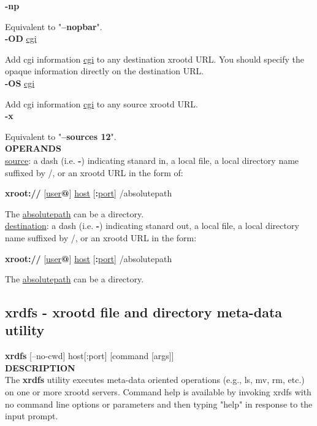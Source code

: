 \documentclass{article}
\begin{document}
		\noindent \textbf{-np}

		\noindent Equivalent to "\textbf{--nopbar}". \\
		
		\noindent \textbf{-OD} \underline{cgi}

		\noindent Add cgi information \underline{cgi} to any destination xrootd URL.
		You should specify the opaque information directly on the destination URL. \\
		
		\noindent \textbf{-OS} \underline{cgi}

		\noindent Add cgi information \underline{cgi} to any source xrootd URL. \\
		
		\noindent \textbf{-x}

		\noindent Equivalent to "\textbf{--sources 12}". \\
		
		\noindent \textbf{OPERANDS} \\
		
		\noindent \underline{source}: a dash (i.e. \textbf{-}) indicating stanard in, a local file, a local directory 
		name suffixed by /, or an xrootd URL in the form of:
		
		\textbf{xroot://} [\underline{user}\textbf{@}] \underline{host} [\textbf{:}\underline{port}] /absolutepath
		
		\noindent The \underline{absolutepath} can be a directory. \\
		
		\noindent \underline{destination}: a dash (i.e. \textbf{-}) indicating stanard out, a local file, a local directory
		name suffixed by /, or an xrootd URL in the form:

		\textbf{xroot://} [\underline{user}\textbf{@}] \underline{host} [\textbf{:}\underline{port}] /absolutepath

		\noindent The \underline{absolutepath} can be a directory.
		
    \subsection{xrdfs - xrootd file and directory meta-data utility}
    
		\textbf{xrdfs} [--no-cwd] host[:port] [command [args]] \\
		
		\noindent \textbf{DESCRIPTION} \\
		
		The \textbf{xrdfs} utility executes meta-data oriented operations (e.g., ls, mv, rm, etc.) on one or more xrootd servers.
		Command help is available by invoking xrdfs with no command line options or parameters and then typing "help" in response
		to the input prompt. \\
		
\end{document}
